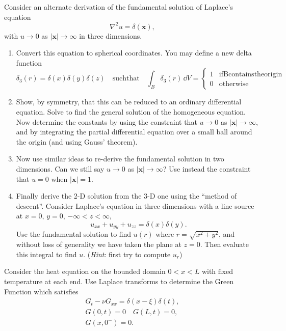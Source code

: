 {\begin{Exercise}
  Consider an alternate derivation of the fundamental solution 
  of Laplace's equation 
  \[ 
  \nabla^2 u = \delta (\mathbf{x}),
  \]
  with $u\to 0$ as $|\mathbf{x}| \to \infty$ in three dimensions. 
  \begin{enumerate} 
  \item 
    Convert this equation to spherical coordinates. 
    You may define a new delta function
    \[ 
    \delta_3(r)=\delta(x)\delta(y)\delta(z) 
    \quad \mathrm{such that} \quad
    \int_B \delta_3(r) \,\dd V 
    = \begin{cases}
      1 & \mathrm{if B contains the origin} \\ 
      0 & \mathrm{otherwise} 
    \end{cases}
    \]
  \item 
    Show, by symmetry, that this can be reduced to an ordinary differential
    equation. Solve 
    to find the general solution of the homogeneous equation. Now
    determine the constants by using the constraint that $u \to 0$ 
    as $|\mathbf{x}| \to \infty$, and by integrating the partial differential equation
    over a small ball around the origin (and using Gauss' theorem). 
  \item 
    Now use similar ideas to re-derive the fundamental solution in 
    two dimensions. Can we still say $u \to 0$ as $|\mathbf{x}| \to \infty$?
    Use instead the constraint that $u = 0$ when $|\mathbf{x}| = 1$.
  \item 
    Finally derive the 2-D solution from the 3-D one using the 
    ``method of descent''. Consider Laplace's equation in three dimensions 
    with a line source at $x = 0$, $y = 0$, $-\infty < z < \infty$,
    \[  
    u_{xx} + u_{yy} + u_{zz} = \delta(x) \delta(y).
    \]
    Use the fundamental solution to find $u(r)$ 
    where $r = \sqrt{x^2 + y^2}$, and without loss of generality we have taken 
    the plane at $z = 0$. Then evaluate this integral to find $u$. 
    ({\it {Hint}}: first try to compute $u_r$) 
  \end{enumerate}
\end{Exercise}










\begin{Exercise}
  Consider the heat equation on the bounded domain $0 < x < L$ with fixed
  temperature at each end. Use Laplace transforms to determine 
  the Green Function which satisfies
  \begin{gather*}
    G_t - \nu G_{xx} = \delta(x-\xi) \delta(t), 
    \\
    G(0,t) = 0 \quad G(L,t) = 0,
    \\
    G(x,0^-) = 0.
  \end{gather*}
  

\end{Exercise}}
